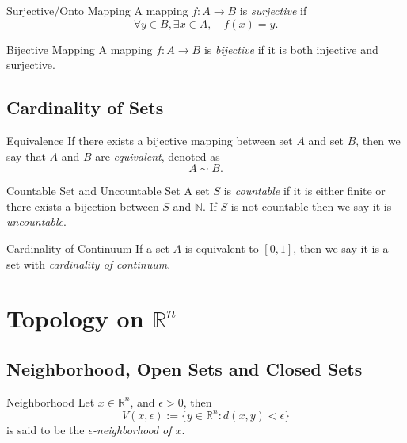 \begin{definition}{Surjective/Onto Mapping}{}
  A mapping $f:A \rightarrow B$ is \emph{surjective} if
  \begin{equation}
    \forall y \in B, \exists x \in A, \quad f(x) = y.
  \end{equation}
\end{definition}

\begin{definition}{Bijective Mapping}{}
  A mapping $f:A \rightarrow B$ is \emph{bijective} if it is both injective and surjective.
\end{definition}

\subsection{Cardinality of Sets}

\begin{definition}{Equivalence}{}
  If there exists a bijective mapping between set $A$ and set $B$,
  then we say that $A$ and $B$ are \emph{equivalent}, denoted as
  \begin{equation}
    A \sim B.
  \end{equation}
\end{definition}

\begin{definition}{Countable Set and Uncountable Set}{}
  A set $S$ is \emph{countable} if it is either finite or there
  exists a bijection between $S$ and $\mathbb{N}$.
  If $S$ is not countable then we say it is \emph{uncountable}.
\end{definition}

\begin{definition}{Cardinality of Continuum}{}
  If a set $A$ is equivalent to $[0, 1]$,
  then we say it is a set with \emph{cardinality of continuum}.
\end{definition}

\section{Topology on $\mathbb{R}^n$}

\subsection{Neighborhood, Open Sets and Closed Sets}

\begin{definition}{Neighborhood}{}
  Let $x \in \mathbb{R}^n$, and $\epsilon > 0$, then 
  \begin{equation}
    V(x, \epsilon) := \{y \in \mathbb{R}^n: d(x,y) < \epsilon\}
  \end{equation}
  is said to be the \emph{$\epsilon$-neighborhood of $x$}.
\end{definition}

